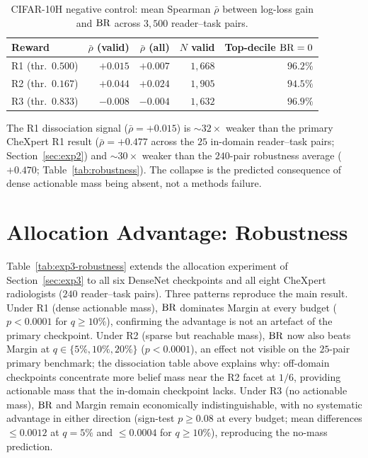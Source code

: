 \begin{table}[htbp]
\centering
\caption{CIFAR-10H negative control: mean Spearman $\bar\rho$ between log-loss gain and $\operatorname{BR}$ across $3{,}500$ reader--task pairs.}
\label{tab:cifar10h}
\small
\begin{tabular}{@{}lrrrr@{}}
\toprule
Reward & $\bar\rho$ (valid) & $\bar\rho$ (all) & $N$ valid & Top-decile $\operatorname{BR}=0$ \\
\midrule
R1 (thr.\ $0.500$) & $+0.015$ & $+0.007$ & $1{,}668$ & $96.2\%$ \\
R2 (thr.\ $0.167$) & $+0.044$ & $+0.024$ & $1{,}905$ & $94.5\%$ \\
R3 (thr.\ $0.833$) & $-0.008$ & $-0.004$ & $1{,}632$ & $96.9\%$ \\
\bottomrule
\end{tabular}
\end{table}

The R1 dissociation signal ($\bar\rho=+0.015$) is ${\sim}32{\times}$ weaker than the primary CheXpert R1 result ($\bar\rho=+0.477$ across the $25$ in-domain reader--task pairs; Section~\ref{sec:exp2}) and ${\sim}30{\times}$ weaker than the $240$-pair robustness average ($+0.470$; Table~\ref{tab:robustness}).
The collapse is the predicted consequence of dense actionable mass being absent, not a methods failure.

\section{Allocation Advantage: Robustness}
\label{app:exp3-robustness}

Table~\ref{tab:exp3-robustness} extends the allocation experiment of Section~\ref{sec:exp3} to all six DenseNet checkpoints and all eight CheXpert radiologists ($240$ reader--task pairs).
Three patterns reproduce the main result.
Under R1 (dense actionable mass), $\operatorname{BR}$ dominates Margin at every budget ($p<0.0001$ for $q\geq 10\%$), confirming the advantage is not an artefact of the primary checkpoint.
Under R2 (sparse but reachable mass), $\operatorname{BR}$ now also beats Margin at $q\in\{5\%,10\%,20\%\}$ ($p<0.0001$), an effect not visible on the $25$-pair primary benchmark; the dissociation table above explains why: off-domain checkpoints concentrate more belief mass near the R2 facet at $1/6$, providing actionable mass that the in-domain checkpoint lacks.
Under R3 (no actionable mass), $\operatorname{BR}$ and Margin remain economically indistinguishable, with no systematic advantage in either direction (sign-test $p \geq 0.08$ at every budget; mean differences $\leq 0.0012$ at $q=5\%$ and $\leq 0.0004$ for $q \geq 10\%$), reproducing the no-mass prediction.

